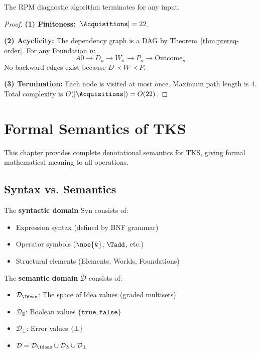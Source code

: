 \begin{theorem}
\label{thm:rpm-term}
The RPM diagnostic algorithm terminates for any input.
\end{theorem}

\begin{proof}
\textbf{(1) Finiteness:} $|\Acquisitions| = 22$.

\textbf{(2) Acyclicity:} The dependency graph is a DAG by Theorem~\ref{thm:prereq-order}. For any Foundation $n$:
\[
A0 \to D_n \to W_n \to P_n \to \mathrm{Outcome}_n
\]
No backward edges exist because $D \prec W \prec P$.

\textbf{(3) Termination:} Each node is visited at most once. Maximum path length is 4. Total complexity is $O(|\Acquisitions|) = O(22)$.
\end{proof}

\chapter{Formal Semantics of TKS}
\label{ch:denotational-semantics}

This chapter provides complete denotational semantics for TKS, giving formal mathematical meaning to all operations.

\section{Syntax vs. Semantics}

\begin{definition}
\label{def:syntactic-domain}
The \textbf{syntactic domain} $\mathrm{Syn}$ consists of:
\begin{itemize}
  \item Expression syntax (defined by BNF grammar)
  \item Operator symbols ($\noe{k}$, $\Tadd$, etc.)
  \item Structural elements (Elements, Worlds, Foundations)
\end{itemize}
\end{definition}

\begin{definition}
\label{def:semantic-domain}
The \textbf{semantic domain} $\mathcal{D}$ consists of:
\begin{itemize}
  \item $\mathcal{D}_\Ideas$: The space of Idea values (graded multisets)
  \item $\mathcal{D}_\mathbb{B}$: Boolean values $\{\mathtt{true}, \mathtt{false}\}$
  \item $\mathcal{D}_\bot$: Error values $\{\bot\}$
  \item $\mathcal{D} = \mathcal{D}_\Ideas \cup \mathcal{D}_\mathbb{B} \cup \mathcal{D}_\bot$
\end{itemize}
\end{definition}


